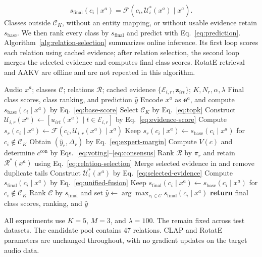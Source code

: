 \[
s_{\mathrm{final}}(c_i\mid x^a)=\mathcal F(c_i,\mathcal U_i^*(x^a)\mid x^a).
\]
Classes outside $\mathcal C_K$, without an entity mapping, or without usable evidence retain $s_{\mathrm{base}}$. We then rank every class by $s_{\mathrm{final}}$ and predict with Eq.~\eqref{eq:prediction}. Algorithm~\ref{alg:relation-selection} summarizes online inference. Its first loop scores each relation using cached evidence; after relation selection, the second loop merges the selected evidence and computes final class scores. RotatE retrieval and AAKV are offline and are not repeated in this algorithm.

\begin{algorithm}[H]
\caption{Online inference with sample-level relation selection and Hierarchical Fusion}
\label{alg:relation-selection}
\fontsize{7}{10}\selectfont
\begin{algorithmic}[1]
\Require Audio $x^a$; classes $\mathcal C$; relations $\mathcal R$; cached evidence $\{\mathcal E_{i,r},\mathbf z_{irt}\}$; $K,N_r,\alpha,\lambda$
\Ensure Final class scores, class ranking, and prediction $\hat y$
\State Encode $x^a$ as $\mathbf e^a$, and compute $s_{\mathrm{base}}(c_i\mid x^a)$ by Eq.~\eqref{eq:base-score}
\State Select $\mathcal C_K$ by Eq.~\eqref{eq:topk}
    \State Construct $\mathcal U_{i,r}(x^a)\gets[u_{irt}(x^a)\mid t\in\mathcal E_{i,r}]$ by Eq.~\eqref{eq:evidence-score}
    \State Compute $s_r(c_i\mid x^a)\gets\mathcal F(c_i,\mathcal U_{i,r}(x^a)\mid x^a)$
  \EndFor
  \State Keep $s_r(c_i\mid x^a)\gets s_{\mathrm{base}}(c_i\mid x^a)$ for $c_i\notin\mathcal C_K$
  \State Obtain $(\hat y_r,\Delta_r)$ by Eq.~\eqref{eq:expert-margin}
\EndFor
\State Compute $V(c)$ and determine $c^{\mathrm{con}}$ by Eqs.~\eqref{eq:voting}--\eqref{eq:consensus}
\State Rank $\mathcal R$ by $\pi_r$ and retain $\mathcal R^*(x^a)$ using Eq.~\eqref{eq:relation-selection}
  \State Merge selected evidence in  and remove duplicate tails
  \State Construct $\mathcal U_i^*(x^a)$ by Eq.~\eqref{eq:selected-evidence}
  \State Compute $s_{\mathrm{final}}(c_i\mid x^a)$ by Eq.~\eqref{eq:unified-fusion}
\EndFor
\State Keep $s_{\mathrm{final}}(c_i\mid x^a)\gets s_{\mathrm{base}}(c_i\mid x^a)$ for $c_i\notin\mathcal C_K$
\State Rank $\mathcal C$ by $s_{\mathrm{final}}$ and set $\hat y\gets\arg\max_{c_i\in\mathcal C}s_{\mathrm{final}}(c_i\mid x^a)$
\State \textbf{return} final class scores, ranking, and $\hat y$
\end{algorithmic}
\end{algorithm}

All experiments use $K=5$, $M=3$, and $\lambda=100$. The  remain fixed across test datasets. The candidate pool contains 47 relations. CLAP and RotatE parameters are unchanged throughout, with no gradient updates on the target audio data.
